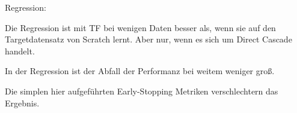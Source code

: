 Regression:

Die Regression ist mit TF bei wenigen Daten besser als, wenn sie auf den Targetdatensatz von Scratch lernt. 
Aber nur, wenn es sich um Direct Cascade handelt. 


In der Regression ist der Abfall der Performanz bei weitem weniger groß. %

Die simplen hier aufgeführten Early-Stopping Metriken verschlechtern das Ergebnis. 
